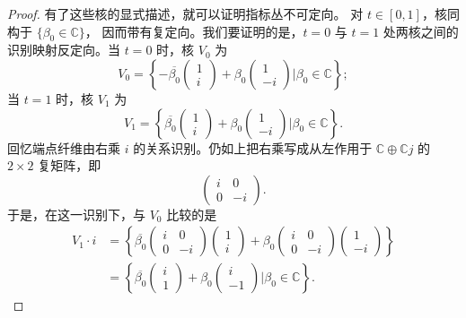 \begin{proof}
有了这些核的显式描述，就可以证明指标丛不可定向。
对 $t\in[0,1]$，核同构于 $\{\beta_0\in\mathbb C\}$，
因而带有复定向。我们要证明的是，$t=0$ 与 $t=1$ 处两核之间的
识别映射反定向。当 $t=0$ 时，核 $V_0$ 为
\[
 V_0=
 \left\{
 -\overline{\beta_0}\begin{pmatrix}1\\i\end{pmatrix}
 +\beta_0\begin{pmatrix}1\\-i\end{pmatrix}
 \mathrel{\Big|}\beta_0\in\mathbb C
 \right\};
\]
当 $t=1$ 时，核 $V_1$ 为
\[
 V_1=
 \left\{
 \overline{\beta_0}\begin{pmatrix}1\\i\end{pmatrix}
 +\beta_0\begin{pmatrix}1\\-i\end{pmatrix}
 \mathrel{\Big|}\beta_0\in\mathbb C
 \right\}.
\]
回忆端点纤维由右乘 $i$ 的关系识别。仍如上把右乘写成从左作用于
$\mathbb C\oplus\mathbb Cj$ 的 $2\times2$ 复矩阵，即
\[
 \begin{pmatrix}i&0\\0&-i\end{pmatrix}.
\]
于是，在这一识别下，与 $V_0$ 比较的是
\[
\begin{aligned}
 V_1\cdot i
 &={}
 \left\{
 \overline{\beta_0}
  \begin{pmatrix}i&0\\0&-i\end{pmatrix}
  \begin{pmatrix}1\\i\end{pmatrix}
 +\beta_0
  \begin{pmatrix}i&0\\0&-i\end{pmatrix}
  \begin{pmatrix}1\\-i\end{pmatrix}
 \right\}
 \\
 &={}
 \left\{
 \overline{\beta_0}\begin{pmatrix}i\\1\end{pmatrix}
 +\beta_0\begin{pmatrix}i\\-1\end{pmatrix}
 \mathrel{\Big|}\beta_0\in\mathbb C
 \right\}.
\end{aligned}
\]
\end{proof}
